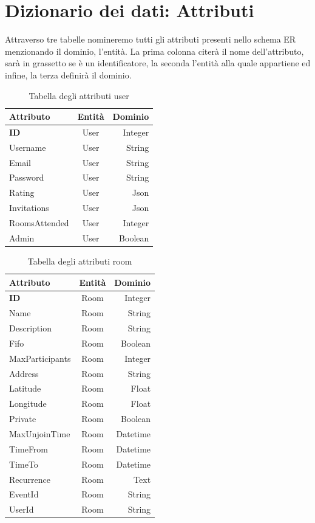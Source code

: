 \section{Dizionario dei dati: Attributi}
Attraverso tre tabelle nomineremo tutti gli attributi presenti nello schema ER menzionando il dominio, l'entità.
La prima colonna citerà il nome dell'attributo, sarà in grassetto se è un identificatore, la seconda l'entità alla quale appartiene ed infine, la terza definirà il dominio.

\begin{table}[H]
	\centering
	\caption{Tabella degli attributi user}
	\begin{tabular}{l c r}
		\toprule
		Attributo & Entità & Dominio\\
		\midrule
		\textbf{ID} & User & Integer \\
		Username & User & String \\
		Email & User & String \\
		Password & User & String \\
		Rating & User & Json \\
		Invitations & User & Json\\
		RoomsAttended & User & Integer\\
		Admin & User & Boolean\\
		\bottomrule
	\end{tabular}
\end{table}

\begin{table}[H]
	\centering
	\caption{Tabella degli attributi room}
	\begin{tabular}{l c r}
		\toprule
		Attributo & Entità & Dominio\\
		\midrule
		\textbf{ID} & Room & Integer \\
		Name & Room & String \\
		Description & Room & String \\
		Fifo & Room & Boolean\\
		MaxParticipants & Room & Integer\\
		Address & Room & String\\
		Latitude & Room & Float\\
		Longitude & Room & Float\\
		Private & Room & Boolean\\
		MaxUnjoinTime & Room & Datetime\\
		TimeFrom & Room & Datetime\\
		TimeTo & Room & Datetime\\
		Recurrence & Room & Text\\
		EventId & Room & String\\
		UserId & Room & String\\
		\bottomrule
	\end{tabular}
\end{table}

